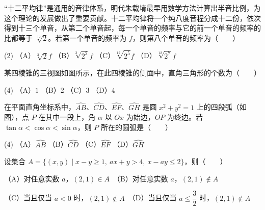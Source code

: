 \begin{question}
“十二平均律”是通用的音律体系，明代朱载堉最早用数学方法计算出半音比例，为这个理论的发展做出了重要贡献。十二平均律将一个纯八度音程分成十二份，依次得到十三个单音，从第二个单音起，每一个单音的频率与它的前一个单音的频率的比都等于 $\sqrt[12]{2}$。若第一个单音的频率为 $f$，则第八个单音的频率为\mbox{（　　）}

\begin{gkopts}(2)
\task （A）$\sqrt[3]{2}f$
\task （B）$\sqrt[3]{2^2}f$
\task （C）$\sqrt[12]{2^5}f$
\task （D）$\sqrt[12]{2^7}f$
\end{gkopts}

\Needspace{0.4\textheight}
\end{question}
\begin{question}
某四棱锥的三视图如图所示，在此四棱锥的侧面中，直角三角形的个数为\mbox{（　　）}
\nopagebreak[4]
\begin{center}\end{center}
\nopagebreak[4]
\begin{gkopts}(4)
\task （A）$1$
\task （B）$2$
\task （C）$3$
\task （D）$4$
\end{gkopts}

\Needspace{0.4\textheight}
\end{question}
\begin{question}
在平面直角坐标系中，$\widehat{AB}$、$\widehat{CD}$、$\widehat{EF}$、$\widehat{GH}$ 是圆 $x^2+y^2=1$ 上的四段弧（如图），点 $P$ 在其中一段上，角 $\alpha$ 以 $Ox$ 为始边，$OP$ 为终边。若 $\tan\alpha<\cos\alpha<\sin\alpha$，则 $P$ 所在的圆弧是\mbox{（　　）}
\nopagebreak[4]
\begin{center}\end{center}
\nopagebreak[4]
\begin{gkopts}(4)
\task （A）$\widehat{AB}$
\task （B）$\widehat{CD}$
\task （C）$\widehat{EF}$
\task （D）$\widehat{GH}$
\end{gkopts}

\end{question}
\begin{question}
设集合 $A=\{(x,y)\mid x-y\ge1,\ ax+y>4,\ x-ay\le2\}$，则\mbox{（　　）}

（A）对任意实数 $a$，$(2,1)\in A$　（B）对任意实数 $a$，$(2,1)\notin A$

（C）当且仅当 $a<0$ 时，$(2,1)\notin A$　（D）当且仅当 $a\le\dfrac32$ 时，$(2,1)\notin A$

\end{question}


